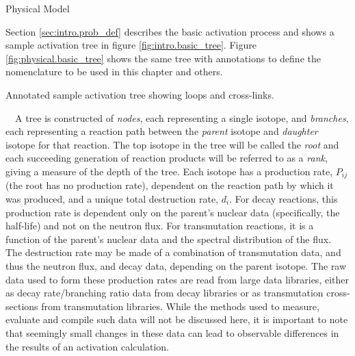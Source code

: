 \begin{chapter}{Physical Model\label{chap:physical}}

Section \ref{sec:intro.prob_def} describes the basic activation
process and shows a sample activation tree in figure
\ref{fig:intro.basic_tree}.  Figure \ref{fig:physical.basic_tree}
shows the same tree with annotations to define the nomenclature to be
used in this chapter and others.

\begin{floatingfigure}{0.55\columnwidth}
  \begin{center}
    \caption{Annotated sample activation tree showing loops and
      cross-links.}\label{fig:physical.basic_tree}
  \end{center}
\end{floatingfigure}

\noindent\ \ A tree is constructed of \textsl{nodes}, each representing a single
isotope, and \linebreak \textsl{branches}, each representing a reaction path
between the \textsl{parent} isotope and \textsl{daughter} isotope for
that reaction.  The top isotope in the tree will be called the
\textsl{root} and each succeeding generation of reaction products will
be referred to as a \textsl{rank}, giving a measure of the depth of
the tree.  Each isotope has a production rate, $P_{ij}$ (the root has
no production rate), dependent on the reaction path by which it was
produced, and a unique total destruction rate, $d_i$.  For decay
reactions, this production rate is dependent only on the parent's
nuclear data (specifically, the half-life) and not on the neutron
flux.  For transmutation reactions, it is a function of the parent's
nuclear data and the spectral distribution of the flux.  The
destruction rate may be made of a combination of transmutation data,
and thus the neutron flux, and decay data, depending on the parent
isotope.  The raw data used to form these production rates are read
from large data libraries, either as decay rate/branching ratio data
from decay libraries or as transmutation cross-sections from
transmutation libraries.  While the methods used to measure, evaluate
and compile such data\cite{EAF,FENDL2} will not be discussed here, it
is important to note that seemingly small changes in these data can
lead to observable differences in the results of an activation
calculation.


\end{chapter}
